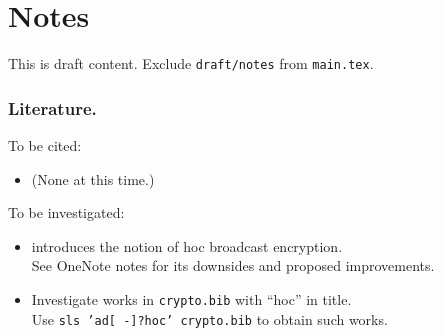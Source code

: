 \section{Notes}

\begingroup
\color{red}
This is draft content.
Exclude \texttt{draft/notes} from \texttt{main.tex}.
\endgroup

\subsubsection{Literature.}
To be cited:
\begin{itemize}
\item (None at this time.)
\end{itemize}
To be investigated:
\begin{itemize}
\item \cite{CCS:WQZD10} introduces the notion of \ad hoc broadcast encryption.\\
See OneNote notes for its downsides and proposed improvements.
\item Investigate works in \texttt{crypto.bib} with ``\ad hoc'' in title.\\
Use \texttt{sls 'ad[ -]?hoc' crypto.bib} to obtain such works.
\end{itemize}
